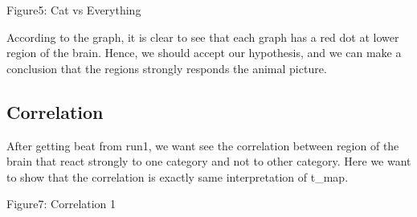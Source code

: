 \documentclass[11pt]{article}
\begin{document}
\begin{housevsface}
\begin{housevsface}
  \centering
    \caption{Figure5: Cat vs Everything}
           
           
According to the graph, it is clear to see that each graph has a red dot at lower region of the brain. Hence, we should accept our hypothesis, and we can make a conclusion that the regions strongly responds the animal picture.

\end{housevsface}


\subsection{Correlation}

\begin{housevsface}
After getting beat from run1, we want see the correlation between  region of the brain that react strongly to one category and not to other category. Here we want to show that the correlation is exactly same interpretation  of t_map. 
  \centering
        \caption{Figure7: Correlation 1}
\end{housevsface}




\end{housevsface}
\end{document}
